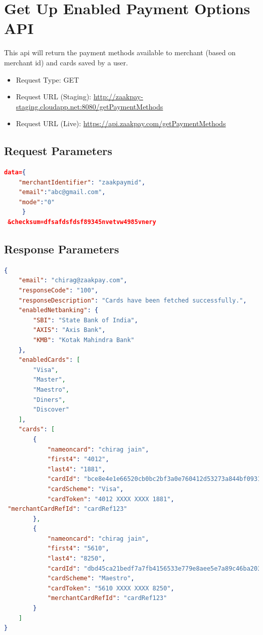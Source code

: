 \documentclass{article}
\begin{document}
\newpage
\section{Get Up Enabled Payment Options API}
This api will return the payment methods available to merchant (based on merchant id) and cards saved by a 
user. 

\begin{itemize}
\item Request Type:	GET 
\item Request URL (Staging): \url{http://zaakpay-staging.cloudapp.net:8080/getPaymentMethods}
\item Request URL (Live): \url{https://api.zaakpay.com/getPaymentMethods}  
\end{itemize}

\subsection{Request Parameters}


\begin{lstlisting}[language=json,breaklines=true]
data={ 
    "merchantIdentifier": "zaakpaymid", 
    "email":"abc@gmail.com", 
    "mode":"0" 
     } 
 &checksum=dfsafdsfdsf89345nvetvw4985vnery

\end{lstlisting}
\subsection{Response Parameters}
\begin{lstlisting}[language=json,breaklines=true]
{ 
    "email": "chirag@zaakpay.com", 
    "responseCode": "100", 
    "responseDescription": "Cards have been fetched successfully.", 
    "enabledNetbanking": { 
        "SBI": "State Bank of India", 
        "AXIS": "Axis Bank", 
        "KMB": "Kotak Mahindra Bank" 
    }, 
    "enabledCards": [ 
        "Visa", 
        "Master", 
        "Maestro", 
        "Diners", 
        "Discover" 
    ], 
    "cards": [ 
        { 
            "nameoncard": "chirag jain", 
            "first4": "4012", 
            "last4": "1881", 
            "cardId": "bce8e4e1e66520cb0bc2bf3a0e760412d53273a844bf0931f2b3136a2ee0ada3~1", 
      		"cardScheme": "Visa", 
            "cardToken": "4012 XXXX XXXX 1881", 
 "merchantCardRefId": "cardRef123" 
        }, 
        { 
            "nameoncard": "chirag jain",  
            "first4": "5610", 
            "last4": "8250", 
            "cardId": "dbd45ca21bedf7a7fb4156533e779e8aee5e7a89c46ba203c85c89f91bd21dd9~12", 
            "cardScheme": "Maestro", 
            "cardToken": "5610 XXXX XXXX 8250", 
 			"merchantCardRefId": "cardRef123" 
        } 
    ] 
} 
\end{lstlisting}
\end{document}
